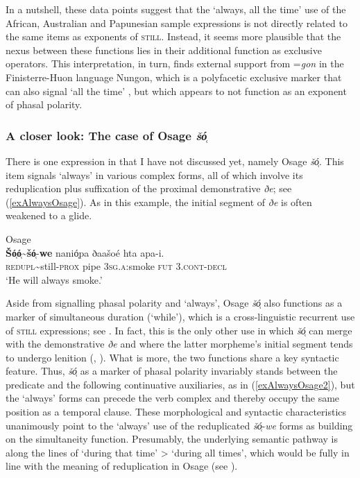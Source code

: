 In a nutshell, these data points suggest that the \lq always, all the time' use of the African, Australian and Papunesian sample expressions is not directly related to the same items as exponents of \textsc{still}. Instead, it  seems more plausible that the nexus between these functions lies in their additional function as exclusive operators. This interpretation, in turn, finds external support from \mbox{=\textit{gon}} in the Finisterre-Huon language Nungon, which is a polyfacetic exclusive marker that can also signal \lq all the time\rq{ }\parencite[417]{Sarvasy2017}, but which appears to not function as an exponent of phasal polarity.

\subsubsection{A closer look: The case of Osage \textit{šó̜}} 
There is one expression in  that I have not discussed yet, namely Osage \textit{šó̜}. This item signals \lq always\rq{ }in various complex forms, all of which involve its reduplication plus suffixation of the proximal demonstrative \textit{ðe}; see (\ref{exAlwaysOsage}). As in this example, the initial segment of \textit{ðe} is often weakened to a glide.

\begin{exe}
	\ex Osage\label{exAlwaysOsage}\\
	\gll \textbf{Šó̜ó̜}\sim{}\textbf{šó̜}-\textbf{we} nanió̜pa ðaašoé hta apa-i.\\
	\textsc{redupl}\sim{}still-\textsc{prox} pipe 3\textsc{sg}.\textsc{a}:smoke \textsc{fut} 3.\textsc{cont}-\textsc{decl}\\
	\glt \lq He will always smoke.\rq{ }\parencite[328]{Quintero2004}
\end{exe}

Aside from signalling phasal polarity and \lq always\rq{}, Osage \textit{šó̜} also functions as a marker of simultaneous duration (\lq while\rq), which is a cross-linguistic recurrent use of \textsc{still} expressions; see . In fact, this is the only other use in which \textit{šó̜} can merge with the demonstrative \textit{ðe} and where the latter morpheme's initial segment tends to undergo lenition (\cite[444]{Quintero2004}, \citeyear[209]{QuinteroDictionary}). What is more, the two functions share a key syntactic feature. Thus, \textit{šó̜} as a marker of phasal polarity invariably stands between the predicate and the following continuative auxiliaries, as in (\ref{exAlwaysOsage2}), but the \lq always\rq{ }forms can precede the verb complex and thereby occupy the same position as a temporal clause. These morphological and syntactic characteristics unanimously point to the \lq always\rq{ }use of the reduplicated \mbox{\textit{šó̜}-\textit{we}} forms as building on the simultaneity function. Presumably, the underlying semantic pathway is along the lines of \lq during that time' > \lq during all times', which would be fully in line with the meaning of reduplication in Osage (see \cite[87, 444]{Quintero2004}).

